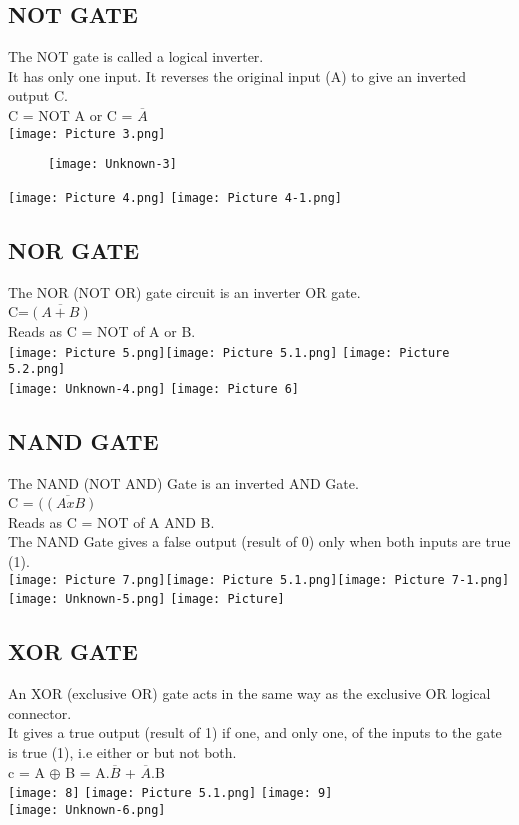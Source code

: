 \documentclass{article}
\begin{document}
\subsection{NOT GATE}
The NOT gate is called a logical inverter.\\
It has only one input. It reverses the original input (A) to give an inverted output C.\\
C = NOT A or C = $\overline{A}$\\
\texttt{[image: Picture 3.png]}\\
\begin{figure}[h!]
	\centering
	\texttt{[image: Unknown-3]}
\end{figure}
\newpage
\texttt{[image: Picture 4.png]} \texttt{[image: Picture 4-1.png]}
\newpage
\subsection{NOR GATE}
The NOR (NOT OR) gate circuit is an inverter OR gate.\\
C=$\overline{(A+B)}$\\
Reads as C = NOT of A or B.\\
\texttt{[image: Picture 5.png]}\texttt{[image: Picture 5.1.png]}  \texttt{[image: Picture 5.2.png]}\\
\texttt{[image: Unknown-4.png]}
\newpage
\texttt{[image: Picture 6]}\\
\newpage

\subsection{NAND GATE}
The NAND (NOT AND) Gate is an inverted AND Gate.\\
C = $\overline{((A x B)}$\\
Reads as C = NOT of A AND B.\\
The NAND Gate gives a false output (result of 0) only when both inputs are true (1).\\
\texttt{[image: Picture 7.png]}\texttt{[image: Picture 5.1.png]}\texttt{[image: Picture 7-1.png]}\\
\texttt{[image: Unknown-5.png]}
\newpage
\texttt{[image: Picture]}
\newpage
\subsection{XOR GATE}
An XOR (exclusive OR) gate acts in the same way as the exclusive OR logical connector. \\
It gives a true output (result of 1) if one, and only one, of the inputs to the gate is true (1), i.e either or but not both.\\
c = A $\oplus$ B = A.$\overline{B}$ + $\overline{A}$.B\\
\texttt{[image: 8]} \texttt{[image: Picture 5.1.png]} \texttt{[image: 9]}\\
\texttt{[image: Unknown-6.png]}\\
\newpage
\end{document}

